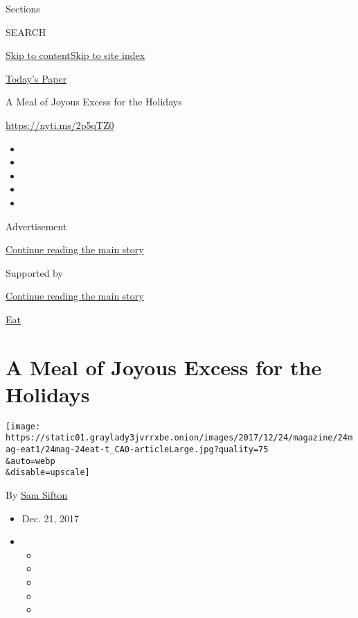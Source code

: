 Sections

SEARCH

\protect\hyperlink{site-content}{Skip to
content}\protect\hyperlink{site-index}{Skip to site index}

\href{https://myaccount.nytimes3xbfgragh.onion/auth/login?response_type=cookie\&client_id=vi}{}

\href{https://www.nytimes3xbfgragh.onion/section/todayspaper}{Today's
Paper}

A Meal of Joyous Excess for the Holidays

\url{https://nyti.ms/2p5qTZ0}

\begin{itemize}
\item
\item
\item
\item
\item
\end{itemize}

Advertisement

\protect\hyperlink{after-top}{Continue reading the main story}

Supported by

\protect\hyperlink{after-sponsor}{Continue reading the main story}

\href{/column/magazine-eat}{Eat}

\hypertarget{a-meal-of-joyous-excess-for-the-holidays}{%
\section{A Meal of Joyous Excess for the
Holidays}\label{a-meal-of-joyous-excess-for-the-holidays}}

\texttt{[image: https://static01.graylady3jvrrxbe.onion/images/2017/12/24/magazine/24mag-eat1/24mag-24eat-t\_CA0-articleLarge.jpg?quality=75\\\&auto=webp\\\&disable=upscale]}

By \href{http://www.nytimes3xbfgragh.onion/by/sam-sifton}{Sam Sifton}

\begin{itemize}
\item
  Dec. 21, 2017
\item
  \begin{itemize}
  \item
  \item
  \item
  \item
  \item
  \end{itemize}
\end{itemize}

